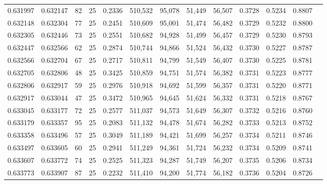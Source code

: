 \begin{tabular}{rrrrrrrrrrrrr}
0.631997 & 0.632147 &    82 &  25 &                                     0.2336 & 510,532 &  95,078 &  51,449 &  56,507 & 0.3728 & 0.5234 & 0.8807 \\
0.632148 & 0.632304 &    77 &  25 &                                     0.2451 & 510,609 &  95,001 &  51,474 &  56,482 & 0.3729 & 0.5232 & 0.8800 \\
0.632305 & 0.632446 &    73 &  25 &                                     0.2551 & 510,682 &  94,928 &  51,499 &  56,457 & 0.3729 & 0.5230 & 0.8793 \\
0.632447 & 0.632566 &    62 &  25 &                                     0.2874 & 510,744 &  94,866 &  51,524 &  56,432 & 0.3730 & 0.5227 & 0.8787 \\
0.632566 & 0.632704 &    67 &  25 &                                     0.2717 & 510,811 &  94,799 &  51,549 &  56,407 & 0.3730 & 0.5225 & 0.8781 \\
0.632705 & 0.632806 &    48 &  25 &                                     0.3425 & 510,859 &  94,751 &  51,574 &  56,382 & 0.3731 & 0.5223 & 0.8777 \\
0.632806 & 0.632917 &    59 &  25 &                                     0.2976 & 510,918 &  94,692 &  51,599 &  56,357 & 0.3731 & 0.5220 & 0.8771 \\
0.632917 & 0.633044 &    47 &  25 &                                     0.3472 & 510,965 &  94,645 &  51,624 &  56,332 & 0.3731 & 0.5218 & 0.8767 \\
0.633045 & 0.633177 &    72 &  25 &                                     0.2577 & 511,037 &  94,573 &  51,649 &  56,307 & 0.3732 & 0.5216 & 0.8760 \\
0.633179 & 0.633357 &    95 &  25 &                                     0.2083 & 511,132 &  94,478 &  51,674 &  56,282 & 0.3733 & 0.5213 & 0.8752 \\
0.633358 & 0.633496 &    57 &  25 &                                     0.3049 & 511,189 &  94,421 &  51,699 &  56,257 & 0.3734 & 0.5211 & 0.8746 \\
0.633497 & 0.633605 &    60 &  25 &                                     0.2941 & 511,249 &  94,361 &  51,724 &  56,232 & 0.3734 & 0.5209 & 0.8741 \\
0.633607 & 0.633772 &    74 &  25 &                                     0.2525 & 511,323 &  94,287 &  51,749 &  56,207 & 0.3735 & 0.5206 & 0.8734 \\
0.633773 & 0.633907 &    87 &  25 &                                     0.2232 & 511,410 &  94,200 &  51,774 &  56,182 & 0.3736 & 0.5204 & 0.8726 \\

\end{tabular}
